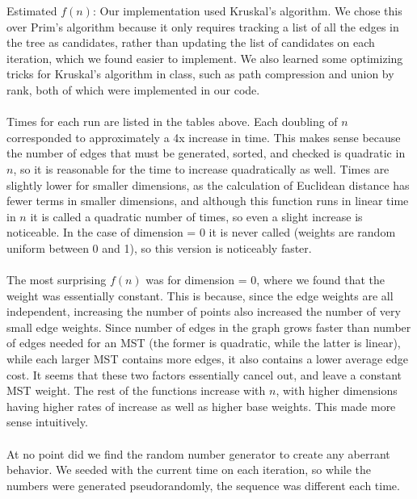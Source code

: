 \documentclass[11pt]{article}
\begin{document}
	Estimated $f(n)$: 
\newpage	
\noindent Our implementation used Kruskal's algorithm. We chose this over Prim's algorithm because it only requires tracking a list of all the edges in the tree as candidates, rather than updating the list of candidates on each iteration, which we found easier to implement. We also learned some optimizing tricks for Kruskal's algorithm in class, such as path compression and union by rank, both of which were implemented in our code.\\
\\
Times for each run are listed in the tables above. Each doubling of $n$ corresponded to approximately a 4x increase in time. This makes sense because the number of edges that must be generated, sorted, and checked is quadratic in $n$, so it is reasonable for the time to increase quadratically as well. Times are slightly lower for smaller dimensions, as the calculation of Euclidean distance has fewer terms in smaller dimensions, and although this function runs in linear time in $n$ it is called a quadratic number of times, so even a slight increase is noticeable. In the case of dimension = 0 it is never called (weights are random uniform between 0 and 1), so this version is noticeably faster.\\
\\
The most surprising $f(n)$ was for dimension = 0, where we found that the weight was essentially constant. This is because, since the edge weights are all independent, increasing the number of points also increased the number of very small edge weights. Since number of edges in the graph grows faster than number of edges needed for an MST (the former is quadratic, while the latter is linear), while each larger MST contains more edges, it also contains a lower average edge cost. It seems that these two factors essentially cancel out, and leave a constant MST weight. The rest of the functions increase with $n$, with higher dimensions having higher rates of increase as well as higher base weights. This made more sense intuitively.
\\
\\
At no point did we find the random number generator to create any aberrant behavior. We seeded with the current time on each iteration, so while the numbers were generated pseudorandomly, the sequence was different each time.
\end{document}
